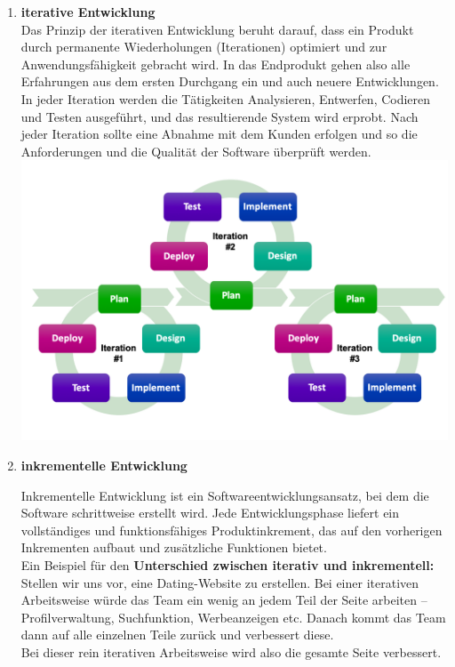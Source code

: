 \documentclass{article}
\begin{document}
\begin{enumerate}[label=\alph*)]
  \item  \textbf{iterative Entwicklung}\\
  Das Prinzip der iterativen Entwicklung beruht darauf, dass ein Produkt durch permanente Wiederholungen (Iterationen) optimiert und zur Anwendungsfähigkeit gebracht wird.
In das Endprodukt gehen also alle Erfahrungen aus dem ersten Durchgang ein und auch neuere
Entwicklungen.
In jeder Iteration werden die Tätigkeiten Analysieren, Entwerfen, Codieren und Testen ausgeführt, und das
resultierende System wird erprobt.
Nach jeder Iteration sollte eine Abnahme mit dem Kunden erfolgen und so die Anforderungen und die Qualität der Software überprüft werden.\\
	\includegraphics[scale=0.4]{media/iterativeEntwicklung.png}


  \item  \textbf{inkrementelle Entwicklung}\\
  Inkrementelle Entwicklung ist ein Softwareentwicklungsansatz, bei dem die Software schrittweise erstellt wird. Jede Entwicklungsphase liefert ein vollständiges und funktionsfähiges Produktinkrement, das auf den vorherigen Inkrementen aufbaut und zusätzliche Funktionen bietet.\\
  Ein Beispiel für den \textbf{Unterschied zwischen iterativ und inkrementell:}\\
Stellen wir uns vor, eine Dating-Website zu erstellen. Bei einer iterativen Arbeitsweise würde das Team ein wenig an jedem Teil der Seite arbeiten – Profilverwaltung, Suchfunktion, Werbeanzeigen etc. Danach kommt das Team dann auf alle einzelnen Teile zurück und verbessert diese.\\
Bei dieser rein iterativen Arbeitsweise wird also die gesamte Seite verbessert.\\


\end{enumerate}
\end{document}
